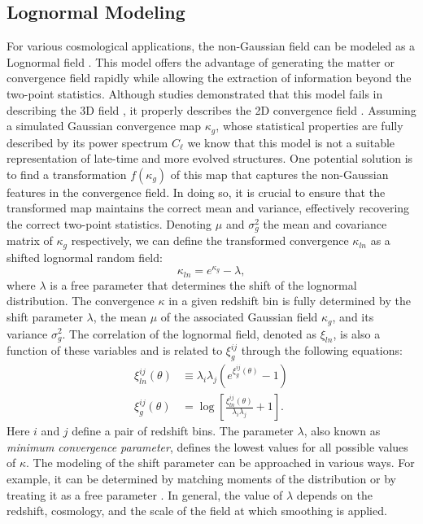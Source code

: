 \documentclass{aa}
\begin{document}
\subsection{Lognormal Modeling}\label{Sec:Lognormal Modeling}
For various cosmological applications, the non-Gaussian field can be modeled as a Lognormal field \citep{coles1991lognormal,bohm2017bayesian}.
This model offers the advantage of generating the matter or convergence field rapidly while allowing the extraction of information beyond the two-point statistics. 
Although studies demonstrated that this model fails in describing the 3D field \citep{klypin2018density}, it properly describes the 2D convergence field \citep{clerkin2017testing, xavier2016improving}.
Assuming a simulated Gaussian convergence map $\kappa_g$, whose statistical properties are fully described by its power spectrum $C_{\ell}$ we know that this model is not a suitable representation of late-time and more evolved structures. One potential solution is to find a transformation $f(\kappa_g)$ of this map that captures the non-Gaussian features in the convergence field. In doing so, it is crucial to ensure that the transformed map maintains the correct mean and variance, effectively recovering the correct two-point statistics.
Denoting $\mu$ and $\sigma_g^2$ the mean and covariance matrix of $\kappa_g$ respectively, we can define the transformed convergence $\kappa_{ln}$ as a shifted lognormal random field:
\begin{equation}\label{Eq:log_norm_kappa}
    \kappa_{ln}=e^{\kappa_{g}}-\lambda, 
\end{equation}
where $\lambda$ is a free parameter that determines the shift of the lognormal distribution. The convergence $\kappa$ in a given redshift bin is fully determined by the shift parameter $\lambda$, the mean $\mu$ of the associated Gaussian field $\kappa_g$, and its variance $\sigma_{g}^2$.
The correlation of the lognormal field, denoted as $\xi_{ln}$, is also a function of these variables and is related to $\xi^{ij}_g$ through the following equations:
\begin{align}
    \xi^{ij}_{ln}(\theta) & \equiv \lambda_i \lambda_j (e^{ \xi^{ij}_g(\theta)}-1) \nonumber \\ 
    \xi^{ij}_g(\theta)&=\log{\left[ \frac{\xi^{ij}_{ln}(\theta)}{\lambda_i \lambda_j}+1\right ]}. \label{Eq:log_norm_corr}
\end{align}
Here $i$ and $j$ define a pair of redshift bins.
The parameter $\lambda$, also known as \textit{minimum convergence
parameter}, defines the lowest values for all possible values of $\kappa$.
The modeling of the shift parameter can be approached in various ways. For example, it can be determined by matching moments of the distribution \citep{xavier2016improving} or by treating it as a free parameter \citep{hilbert2011cosmic}. In general, the value of $\lambda$ depends on the redshift, cosmology, and the scale of the field at which smoothing is applied.
\end{document}
